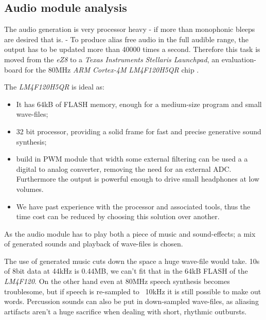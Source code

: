 \subsection{Audio module analysis}
The audio generation is very processor heavy - if more than monophonic
bleeps are desired that is. - To produce alias free audio in the full audible
range, the output has to be updated more than 40000 times a second.
Therefore this task is moved from the \emph{eZ8} to a \emph{Texas
Instruments} \emph{Stellaris Launchpad}, an evaluation-board for the 80MHz
\emph{ARM Cortex-4M} \emph{LM4F120H5QR} chip \cite{Stellaris}.

The \emph{LM4F120H5QR} is ideal as:
\begin{itemize}
  \item It has 64kB of FLASH memory, enough for a medium-size program and small
  wave-files;
  \item 32 bit processor, providing a solid frame for fast and
  precise generative sound synthesis;
  \item build in PWM module that width some external filtering can be used a a
  digital to analog converter, removing the need for an external ADC. Furthermore
  the output is powerful enough to drive small headphones at low volumes.
  \item We have past experience with the processor and associated tools, thus
  the time cost can be reduced by choosing this solution over another.
  
\end{itemize}

As the audio module has to play both a piece of music and sound-effects; a mix
of generated sounds and playback of wave-files is chosen.

The use of generated music cuts down the space a huge wave-file would take. 10s
of 8bit data at 44kHz is 0.44MB, we can't fit that in the 64kB FLASH of the
\emph{LM4F120}. On the other hand even at 80MHz speech synthesis becomes
troublesome, but if speech is re-sampled to ~10kHz it is still possible to make
out words. Percussion sounds can also be put in down-sampled wave-files, as
aliasing artifacts aren't a huge sacrifice when dealing with short, rhythmic
outbursts.


